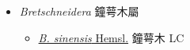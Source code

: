 
  \begin{itemize}
 \item[] \textit{Bretschneidera} 鐘萼木屬
                    
  \begin{itemize}
        \item[] \href{http://www.theplantlist.org/tpl1.1/search?q=Bretschneidera+sinensis}{\textit{B. sinensis} Hemsl.}   鐘萼木 LC
  \end{itemize}
  \end{itemize}
